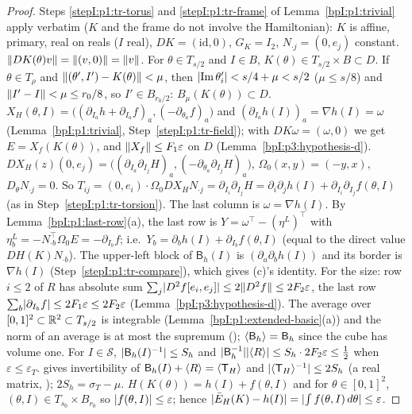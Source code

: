 \begin{proof}
\label{stepI:p3:to-torus}
Steps \ref{stepI:p1:tr-torus} and \ref{stepI:p1:tr-frame} of Lemma~\ref{bpI:p1:trivial} apply verbatim ($K$ and the frame do not involve the Hamiltonian): $K$ is affine, primary, real on reals ($I$ real), $DK=(\mathrm{id},0)$,
$G_K=I_2$, $N_{\cdot j}=(0,e_j)$ constant. $\lVert DK(\theta)v\rVert=\lVert (v,0)\rVert=\lVert v\rVert$. For $\theta\in T_{s/2}$ and $I\in B$, $K(\theta)\in T_{s/2}\times B\subset D$. If $\theta\in T_\rho$ and $\lVert (\theta',I')-K(\theta)\rVert<\mu$, then
$\lvert \operatorname{Im}\theta'_i\rvert<s/4+\mu<s/2$ ($\mu\le s/8$) and $\lVert I'-I\rVert<\mu\le r_0/8$, so $I'\in B_{r_0/2}$: $B_\mu(K(\theta))\subset D$.
\label{stepI:p3:to-error}
$X_H(\theta,I)=\bigl((\partial_{I_a}h+\partial_{I_a}f)_a,(-\partial_{\theta_a}f)_a\bigr)$ and $(\partial_{I_a}h(I))_a=\nabla h(I)=\omega$ (Lemma~\ref{bpI:p1:trivial}, Step~\ref{stepI:p1:tr-field}); with $DK\omega=(\omega,0)$ we get $E=X_f(K(\theta))$, and $\lVert X_f\rVert\le F_1\varepsilon$ on $D$ (Lemma~\ref{bpI:p3:hypothesis-d}).
\label{stepI:p3:to-torsion}
$DX_H(z)(0,e_j)=\bigl((\partial_{I_a}\partial_{I_j}H)_a,(-\partial_{\theta_a}\partial_{I_j}H)_a\bigr)$, $\Omega_0(x,y)=(-y,x)$, $D_\theta N_{\cdot j}=0$. So $T_{ij}=(0,e_i)\cdot\Omega_0DX_HN_{\cdot j}=\partial_{I_i}\partial_{I_j}H=\partial_i\partial_jh(I)+\partial_{I_i}\partial_{I_j}f(\theta,I)$ (as in Step~\ref{stepI:p1:tr-torsion}).
The last column is $\omega=\nabla h(I)$. By Lemma~\ref{bpI:p1:last-row}(a), the last row is $Y=\omega^\top-(\eta^L)^\top$ with $\eta^L_b=-N_{\cdot b}^\top\Omega_0E=-\partial_{I_b}f$; i.e.\ $Y_b=\partial_bh(I)+\partial_{I_b}f(\theta,I)$ (equal to the direct value $DH(K)N_{\cdot b}$).
The upper-left block of $\mathsf B_h(I)$ is $(\partial_a\partial_bh(I))$ and its border is $\nabla h(I)$ (Step~\ref{stepI:p1:tr-compare}), which gives (c)'s identity. For the size: row $i\le2$ of $R$ has absolute sum $\sum_j\lvert D^2f[e_i,e_j]\rvert\le2\lVert D^2f\rVert\le2F_2\varepsilon$, the last row $\sum_b\lvert \partial_{I_b}f\rvert\le2F_1\varepsilon\le2F_2\varepsilon$ (Lemma~\ref{bpI:p3:hypothesis-d}). The average over $[0,1]^2\subset\mathbb{R}^2\subset T_{s/2}$ is integrable (Lemma~\ref{bpI:p1:extended-basic}(a)) and the norm of an average is at most the supremum (); $\langle \mathsf B_h\rangle=\mathsf B_h$ since the cube has volume one.
\label{stepI:p3:to-neumann}
For $I\in\mathcal S$, $\lvert \mathsf B_h(I)^{-1}\rvert\le S_h$ and $\lvert \mathsf B_h^{-1}\rvert\lvert \langle R\rangle\rvert\le S_h\cdot2F_2\varepsilon\le\frac12$ when $\varepsilon\le\varepsilon_T$.  gives invertibility of $\mathsf B_h(I)+\langle R\rangle=\langle \mathsf T_H\rangle$ and $\lvert \langle \mathsf T_H\rangle^{-1}\rvert\le2S_h$ (a real matrix, ); $2S_h=\sigma_T-\mu$.
\label{stepI:p3:to-energy}
$H(K(\theta))=h(I)+f(\theta,I)$ and for $\theta\in[0,1]^2$, $(\theta,I)\in T_{s_0}\times B_{r_0}$ so $\lvert f(\theta,I)\rvert\le\varepsilon$; hence $\lvert \bar E_H(K)-h(I)\rvert=\lvert \int f(\theta,I)\,d\theta\rvert\le\varepsilon$.
\end{proof}

